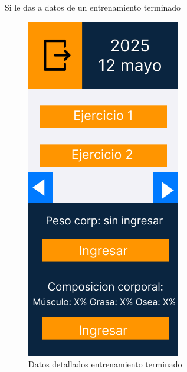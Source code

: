 Si le das a datos de un entrenamiento terminado
\begin{figure}[H]
   \centering
    \includegraphics[width=0.6\textwidth]{fotos/Frame 33.png}
    \caption{Datos detallados entrenamiento terminado}
    \label{fig:Datos detallados entrenamiento terminado}
\end{figure}
